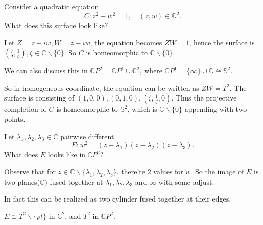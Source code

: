 \begin{example}
    Consider a quadratic equation
	\[
	C: z^2 + w^2 = 1,\quad (z, w)\in \mathbb{C}^2.
	\]
	What does this surface look like?

	Let $Z = z+iw, W = z-iw$, the equation becomes $ZW = 1$,
	hence the surface is $(\zeta, \frac{1}{\zeta}), \zeta\in \mathbb{C}\backslash\{0\}$.
	So $C$ is homeomorphic to $\mathbb{C}\backslash\{0\}$.

	We can also discuss this in $\mathbb{C}P^2 = \mathbb{C}P^1 \cup \mathbb{C}^2$,
	where $\mathbb{C}P^1 = \{\infty\} \cup \mathbb{C}\cong \mathbb{S}^2$.

	So in homogeneous coordinate, the equation can be written as $ZW = T^2$.
	The surface is consisting of $(1,0,0), (0,1,0), (\zeta, \frac{1}{\zeta}, 0)$.
	Thus the projective completion of $C$ is homeomorphic
	to $\mathbb{S}^2$, which is $\mathbb{C}\backslash\{0\}$
	appending with two points.
\end{example}

\begin{example}
    Let $\lambda_1, \lambda_2, \lambda_3\in \mathbb{C}$ pairwise different.
	\[
	E: w^2 = (z-\lambda_1)(z-\lambda_2)(z-\lambda_3).
	\]
	What does $E$ looks like in $\mathbb{C}P^2$?

	Observe that for $z\in \mathbb{C}\backslash\{\lambda_1,\lambda_2,\lambda_3\}$,
	there're 2 values for $w$.
	So the image of $E$ is two planes($\mathbb{C}$) fused together
	at $\lambda_1, \lambda_2, \lambda_3$ and $\infty$ with some adjust.

	In fact this can be realized as two cylinder fused together at their edges.

	$E\cong T^2 \backslash \{pt\}$ in $\mathbb{C}^2$, and $T^2$ in $\mathbb{C}P^2$.
\end{example}
